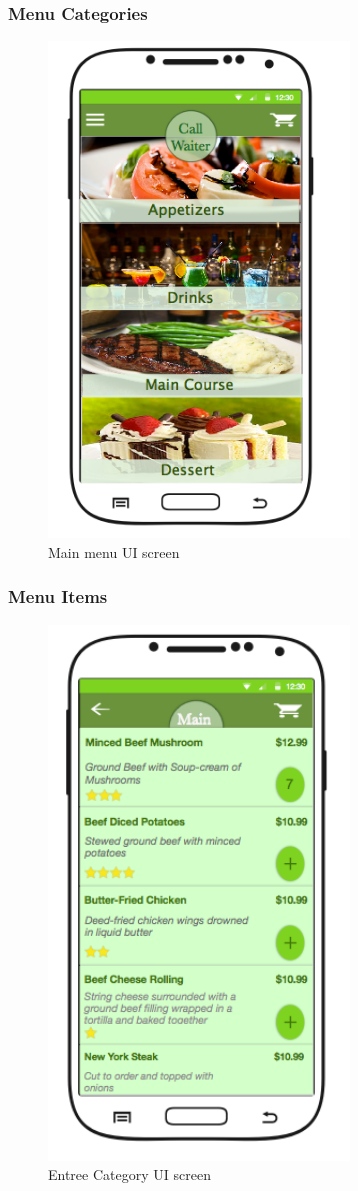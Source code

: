 \documentclass[12pt, titlepage]{article}
\begin{document}
\subsubsection{Menu Categories}
\begin{figure}[H]
\centering 
\includegraphics[width=80mm,scale=0.5]{MenuCategories.png}
\caption{Main menu UI screen}
\end{figure}
\subsubsection{Menu Items}

\begin{figure}[H]
\centering 
\includegraphics[width=80mm,scale=0.5]{CategoryItems.png}
\caption{Entree Category UI screen}
\end{figure}
\end{document}
